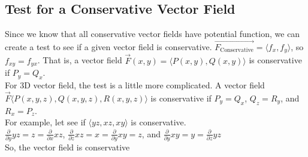 \subsection{Test for a Conservative Vector Field}
\noindent
Since we know that all conservative vector fields have potential function, we can create a test to see if a given vector field is conservative. $\vec{F_{\text{Conservative}}}=\langle f_x, f_y \rangle$, so $f_{xy}=f_{yx}$. That is, a vector field $\vec{F}(x,y)=\langle P(x,y), Q(x,y)\rangle$ is conservative if $P_y=Q_x$.\\
For 3D vector field, the test is a little more complicated. A vector field $\vec{F}\langle P(x,y,z), Q(x,y,z), R(x,y,z)\rangle$ is conservative if $P_y=Q_x$, $Q_z=R_y$, and $R_x=P_z$.\\

\noindent
For example, let see if $\langle yz, xz, xy\rangle$ is conservative.\\
\indent
$\frac{\partial}{\partial y}yz=z=\frac{\partial}{\partial x}xz$, $\frac{\partial}{\partial z}xz=x=\frac{\partial}{\partial y}xy=z$, and $\frac{\partial}{\partial y}xy=y=\frac{\partial}{\partial z}yz$\\
\indent
So, the vector field is conservative\\